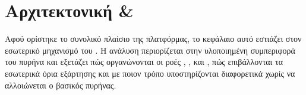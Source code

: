 \chapter{Αρχιτεκτονική  \& }
\label{ch:scorm_runtime_core}

Αφού ορίστηκε το συνολικό πλαίσιο της πλατφόρμας, το κεφάλαιο αυτό εστιάζει στον εσωτερικό μηχανισμό του . Η ανάλυση περιορίζεται στην υλοποιημένη συμπεριφορά του πυρήνα και εξετάζει πώς οργανώνονται οι ροές , ,  και , πώς επιβάλλονται τα εσωτερικά όρια εξάρτησης και με ποιον τρόπο υποστηρίζονται διαφορετικά  χωρίς να αλλοιώνεται ο βασικός  πυρήνας.




